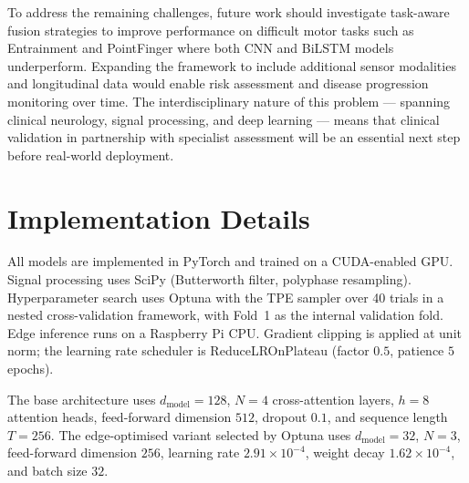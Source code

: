 \documentclass[conference]{IEEEtran}
\begin{document}
To address the remaining challenges, future work should investigate task-aware fusion strategies to improve performance on difficult motor tasks such as Entrainment and PointFinger where both CNN and BiLSTM models underperform. Expanding the framework to include additional sensor modalities and longitudinal data would enable risk assessment and disease progression monitoring over time. The interdisciplinary nature of this problem --- spanning clinical neurology, signal processing, and deep learning --- means that clinical validation in partnership with specialist assessment will be an essential next step before real-world deployment.



\section*{Implementation Details}

All models are implemented in PyTorch and trained on a CUDA-enabled GPU. Signal processing uses SciPy (Butterworth filter, polyphase resampling). Hyperparameter search uses Optuna with the TPE sampler over 40 trials in a nested cross-validation framework, with Fold~1 as the internal validation fold. Edge inference runs on a Raspberry Pi CPU. Gradient clipping is applied at unit norm; the learning rate scheduler is ReduceLROnPlateau (factor $0.5$, patience $5$ epochs).

The base architecture uses $d_{\text{model}}{=}128$, $N{=}4$ cross-attention layers, $h{=}8$ attention heads, feed-forward dimension $512$, dropout $0.1$, and sequence length $T{=}256$. The edge-optimised variant selected by Optuna uses $d_{\text{model}}{=}32$, $N{=}3$, feed-forward dimension $256$, learning rate $2.91{\times}10^{-4}$, weight decay $1.62{\times}10^{-4}$, and batch size $32$.
\end{document}
